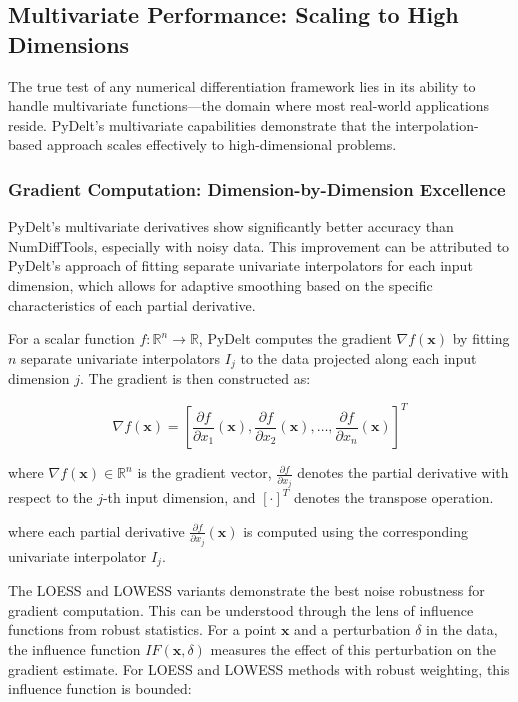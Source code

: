 \documentclass[10pt,journal,compsoc]{IEEEtran}
\begin{document}
\subsection{Multivariate Performance: Scaling to High Dimensions}

The true test of any numerical differentiation framework lies in its ability to handle multivariate functions---the domain where most real-world applications reside. PyDelt's multivariate capabilities demonstrate that the interpolation-based approach scales effectively to high-dimensional problems.

\subsubsection{Gradient Computation: Dimension-by-Dimension Excellence}

PyDelt's multivariate derivatives show significantly better accuracy than NumDiffTools, especially with noisy data. This improvement can be attributed to PyDelt's approach of fitting separate univariate interpolators for each input dimension, which allows for adaptive smoothing based on the specific characteristics of each partial derivative.

For a scalar function $f: \mathbb{R}^n \rightarrow \mathbb{R}$, PyDelt computes the gradient $\nabla f(\mathbf{x})$ by fitting $n$ separate univariate interpolators $I_j$ to the data projected along each input dimension $j$. The gradient is then constructed as:

\begin{equation}
    \nabla f(\mathbf{x}) = \left[ \frac{\partial f}{\partial x_1}(\mathbf{x}), \frac{\partial f}{\partial x_2}(\mathbf{x}), \ldots, \frac{\partial f}{\partial x_n}(\mathbf{x}) \right]^T
\end{equation}

where $\nabla f(\mathbf{x}) \in \mathbb{R}^n$ is the gradient vector, $\frac{\partial f}{\partial x_j}$ denotes the partial derivative with respect to the $j$-th input dimension, and $[\cdot]^T$ denotes the transpose operation.

where each partial derivative $\frac{\partial f}{\partial x_j}(\mathbf{x})$ is computed using the corresponding univariate interpolator $I_j$.

The LOESS and LOWESS variants demonstrate the best noise robustness for gradient computation. This can be understood through the lens of influence functions from robust statistics. For a point $\mathbf{x}$ and a perturbation $\delta$ in the data, the influence function $IF(\mathbf{x}, \delta)$ measures the effect of this perturbation on the gradient estimate. For LOESS and LOWESS methods with robust weighting, this influence function is bounded:
\end{document}
